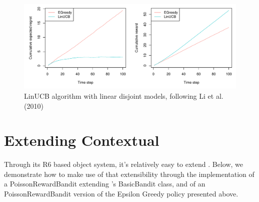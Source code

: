 \documentclass[nojss]{jss}\usepackage[]{graphicx}\usepackage[]{color}
\makeatletter
\def\maxwidth{ %
  \ifdim\Gin@nat@width>\linewidth
    \linewidth
  \else
    \Gin@nat@width
  \fi
}
\newenvironment{knitrout}{}{} %
\makeatother
\begin{document}
\begin{center}
\begin{knitrout}
\color{fgcolor}\begin{figure}[H]
\includegraphics[width=\maxwidth,]{fig/fig3-1} \caption[LinUCB algorithm with linear disjoint models, following Li et al]{LinUCB algorithm with linear disjoint models, following Li et al. (2010)}\label{fig:fig3}
\end{figure}


\end{knitrout}
\end{center}

\section{Extending Contextual}

Through its R6 based object system, it's relatively easy to extend . Below, we demonstrate how to make use of that extensibility through the implementation of a PoissonRewardBandit extending 's BasicBandit class, and of an PoissonRewardBandit version of the Epsilon Greedy policy presented above.
\end{document}
